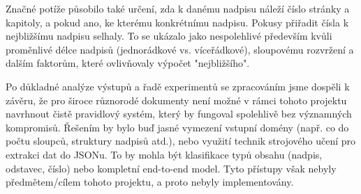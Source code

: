 \documentclass{article}
\begin{document}
Značné potíže působilo také určení, zda k danému nadpisu náleží číslo stránky a kapitoly, a pokud ano, ke kterému konkrétnímu nadpisu. Pokusy přiřadit čísla k nejbližšímu nadpisu selhaly. To se ukázalo jako nespolehlivé především kvůli proměnlivé délce nadpisů (jednorádkové vs. víceřádkové), sloupovému rozvržení a dalším faktorům, které ovlivňovaly výpočet "nejbližšího".

Po důkladné analýze výstupů a řadě experimentů se zpracováním jsme dospěli k závěru, že pro široce různorodé dokumenty není možné v rámci tohoto projektu navrhnout čistě pravidlový systém, který by fungoval spolehlivě bez významných kompromisů. Řešením by bylo buď jasné vymezení vstupní domény (např. co do počtu sloupců, struktury nadpisů atd.), nebo využití technik strojového učení pro extrakci dat do JSONu. To by mohla být klasifikace typů obsahu (nadpis, odstavec, číslo) nebo kompletní end-to-end model. Tyto přístupy však nebyly předmětem/cílem tohoto projektu, a proto nebyly implementovány.
\end{document}
